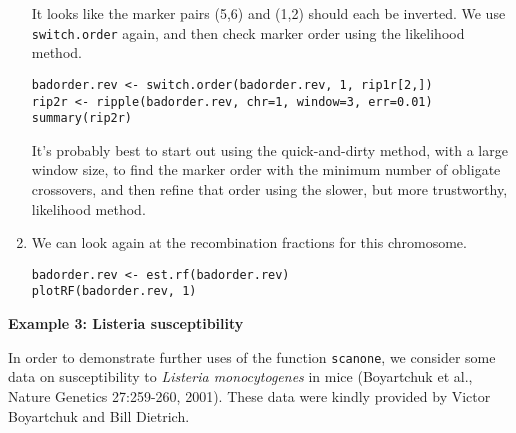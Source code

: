 \documentclass[10pt,letterpaper]{article}
\newcommand{\usercolor}{\color [named]{BlueViolet}}
\begin{document}
\begin{enumerate}
It looks like the marker pairs (5,6) and (1,2) should each be
inverted.  We use \verb-switch.order- again, and then check marker
order using the likelihood method.  

\usercolor
\verb|badorder.rev <- switch.order(badorder.rev, 1, rip1r[2,])|  \\
\verb|rip2r <- ripple(badorder.rev, chr=1, window=3, err=0.01)| \\
\verb|summary(rip2r)| 
\normalcolor

It's probably best to start out using the quick-and-dirty method, with
a large window size, to find the marker order with the minimum number
of obligate crossovers, and then refine that order using the slower,
but more trustworthy, likelihood method.

\item We can look again at the recombination fractions for this
chromosome.

\usercolor
\verb|badorder.rev <- est.rf(badorder.rev)| \\
\verb|plotRF(badorder.rev, 1)| 
\normalcolor

\end{enumerate}




\vspace{12pt}
\noindent \textbf{Example 3: Listeria susceptibility} \vspace{6pt}
\nopagebreak

\noindent In order to demonstrate further uses of the function
\verb-scanone-, we consider some data on susceptibility to
\emph{Listeria monocytogenes\/} in mice (Boyartchuk et al., Nature
Genetics 27:259-260, 2001).  These data were kindly provided by Victor
Boyartchuk and Bill Dietrich.
\end{document}
